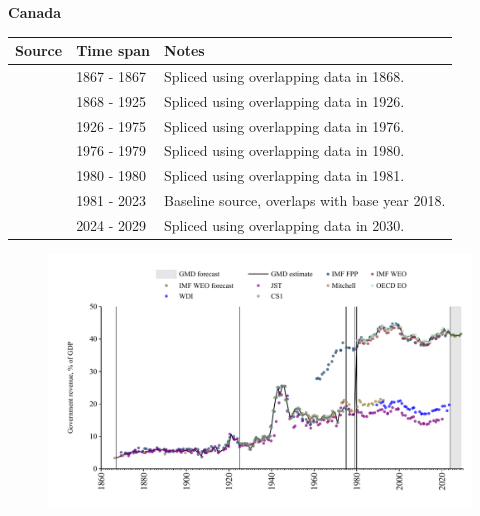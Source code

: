 \documentclass[12pt,a4paper,landscape]{article}
\begin{document}
\begin{adjustbox}{max totalsize={\paperwidth}{\paperheight},center}
\begin{minipage}[t][\textheight][t]{\textwidth}
\vspace*{0.5cm}
{}
\begin{center}
{\Large\bfseries Canada}
\end{center}
\vspace{0.5cm}
\begin{table}[H]
\centering
\small
\begin{tabular}{|l|l|l|}
\hline
\textbf{Source} & \textbf{Time span} & \textbf{Notes} \\
\hline
\rowcolor{white}\cite{Mitchell}& 1867 - 1867 &Spliced using overlapping data in 1868.\\
\rowcolor{lightgray}\cite{JST}& 1868 - 1925 &Spliced using overlapping data in 1926.\\
\rowcolor{white}\cite{CS1_CAN}& 1926 - 1975 &Spliced using overlapping data in 1976.\\
\rowcolor{lightgray}\cite{JST}& 1976 - 1979 &Spliced using overlapping data in 1980.\\
\rowcolor{white}\cite{IMF_WEO}& 1980 - 1980 &Spliced using overlapping data in 1981.\\
\rowcolor{lightgray}\cite{OECD_EO}& 1981 - 2023 &Baseline source, overlaps with base year 2018.\\
\rowcolor{white}\cite{IMF_WEO_forecast}& 2024 - 2029 &Spliced using overlapping data in 2030.\\
\hline
\end{tabular}
\end{table}
\begin{figure}[H]
\centering
\includegraphics[width=\textwidth,height=0.6\textheight,keepaspectratio]{graphs/CAN_govrev_GDP.pdf}
\end{figure}
\end{minipage}
\end{adjustbox}
\end{document}
